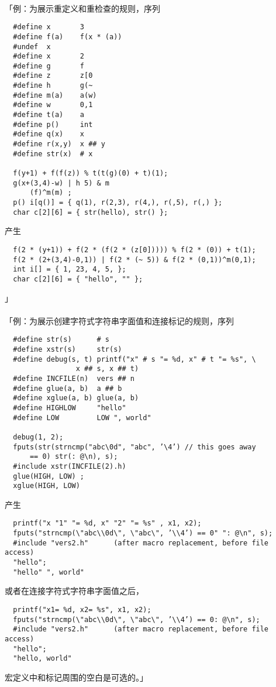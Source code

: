 \paragraph{}
「例：为展示重定义和重检查的规则，序列
\begin{lstlisting}
  #define x       3
  #define f(a)    f(x * (a))
  #undef  x
  #define x       2
  #define g       f
  #define z       z[0
  #define h       g(~
  #define m(a)    a(w)
  #define w       0,1
  #define t(a)    a
  #define p()     int
  #define q(x)    x
  #define r(x,y)  x ## y
  #define str(x)  # x

  f(y+1) + f(f(z)) % t(t(g)(0) + t)(1);
  g(x+(3,4)-w) | h 5) & m
      (f)^m(m) ;
  p() i[q()] = { q(1), r(2,3), r(4,), r(,5), r(,) };
  char c[2][6] = { str(hello), str() };
\end{lstlisting}
产生
\begin{lstlisting}
  f(2 * (y+1)) + f(2 * (f(2 * (z[0])))) % f(2 * (0)) + t(1);
  f(2 * (2+(3,4)-0,1)) | f(2 * (~ 5)) & f(2 * (0,1))^m(0,1);
  int i[] = { 1, 23, 4, 5, };
  char c[2][6] = { "hello", "" };
\end{lstlisting}」

\paragraph{}
「例：为展示创建字符式字符串字面值和连接标记的规则，序列
\begin{lstlisting}
  #define str(s)      # s
  #define xstr(s)     str(s)
  #define debug(s, t) printf("x" # s "= %d, x" # t "= %s", \
                 x ## s, x ## t)
  #define INCFILE(n)  vers ## n
  #define glue(a, b)  a ## b
  #define xglue(a, b) glue(a, b)
  #define HIGHLOW     "hello"
  #define LOW         LOW ", world"

  debug(1, 2);
  fputs(str(strncmp("abc\0d", "abc", ’\4’) // this goes away
      == 0) str(: @\n), s);
  #include xstr(INCFILE(2).h)
  glue(HIGH, LOW) ;
  xglue(HIGH, LOW)
\end{lstlisting}
产生
\begin{lstlisting}
  printf("x "1" "= %d, x" "2" "= %s" , x1, x2);
  fputs("strncmp(\"abc\\0d\", \"abc\", ’\\4’) == 0" ": @\n", s);
  #include "vers2.h"      (after macro replacement, before file access)
  "hello";
  "hello" ", world"
\end{lstlisting}
或者在连接字符式字符串字面值之后，
\begin{lstlisting}
  printf("x1= %d, x2= %s", x1, x2);
  fputs("strncmp(\"abc\\0d\", \"abc\", ’\\4’) == 0: @\n", s);
  #include "vers2.h"      (after macro replacement, before file access)
  "hello";
  "hello, world"
\end{lstlisting}
宏定义中\tm{\#}和\tm{\#\#}标记周围的空白是可选的。」

